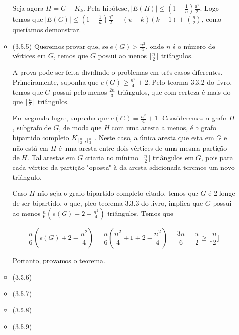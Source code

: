 \documentclass{article}
\begin{document}
\begin{enumerate}
\begin{itemize}
		            Seja agora \(H = G - K_k\). Pela hipótese, \(|E(H)| \leq (1 - \frac{1}{n})\frac{n^2}{2}\).
		            Logo temos que \(|E(G)| \leq (1 - \frac{1}{n})\frac{n^2}{2} + (n-k)(k-1) + \binom{n}{2}\),
		            como queríamos demonstrar.

		      \item (3.5.5)
		            Queremos provar que, se \(e(G) > \frac{n^2}{4}\), onde \(n\) é o número de vértices em \(G\),
		            temos que \(G\) possui ao menos \(\lfloor\frac{n}{2}\rfloor\) triângulos.


		            A prova pode ser feita dividindo o problemas em três casos diferentes. Primeiramente, suponha
		            que \(e(G) \geq \frac{n^2}{4} + 2\). Pelo teorma 3.3.2 do livro, temos que \(G\) possui pelo menos
		            \(\frac{2n}{3}\) triângulos, que com certeza é mais do que \(\lfloor\frac{n}{2}\rfloor\) triângulos.

		            Em segundo lugar, suponha que \(e(G) = \frac{n^2}{4} + 1\). Consideremos o grafo \(H\), subgrafo de \(G\), de modo que
		            \(H\) com uma aresta a menos, é o grafo bipartido completo \(K_{{\lfloor\frac{n}{2}\rfloor}, {\lceil\frac{n}{2}}\rceil}\).
		            Neste caso, a única aresta que esta em \(G\) e não está em \(H\) é uma aresta entre dois vértices de uma mesma
		            partição de \(H\). Tal arestas em \(G\) criaria no mínimo \(\lfloor\frac{n}{2}\rfloor\) triângulos em \(G\), pois para
		            cada vértice da partição "oposta" à da aresta adicionada teremos um novo triângulo.

		            Caso \(H\) não seja o grafo bipartido completo citado, temos que \(G\) é 2-longe de ser bipartido, o que, pleo teorema
		            3.3.3 do livro, implica que \(G\) possui ao menos \(\frac{n}{6}(e(G) + 2 - \frac{n^2}{4})\) triângulos. Temos que:

		            \[\frac{n}{6}(e(G) + 2 - \frac{n^2}{4}) = \frac{n}{6}(\frac{n^2}{4} + 1 + 2 - \frac{n^2}{4}) = \frac{3n}{6} = \frac{n}{2} \geq \lfloor\frac{n}{2}\rfloor\]

		            Portanto, provamos o teorema.


		      \item (3.5.6)
		      \item (3.5.7)
		      \item (3.5.8)
		      \item (3.5.9)
	      \end{itemize}
\end{enumerate}
\end{document}
